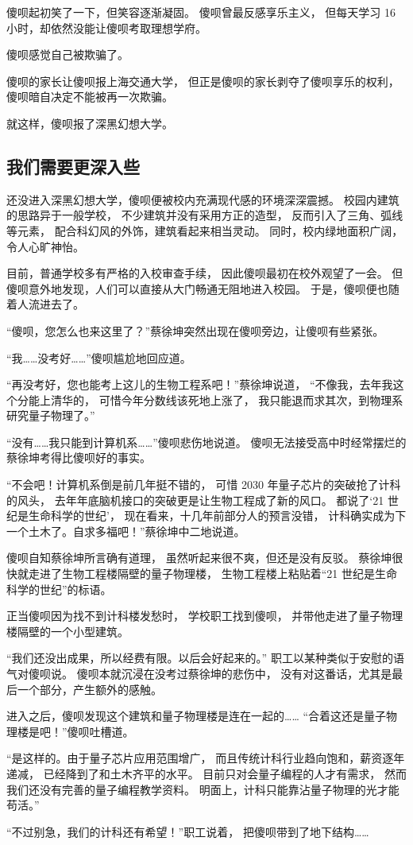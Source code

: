 \documentclass[UTF8,a4paper,11pt]{ctexart}
\newcommand{\p}{傻呗} %
\newcommand{\q}{蔡徐坤} %
\newcommand{\X}{深黑幻想大学} %
\begin{document}
      \p 起初笑了一下，但笑容逐渐凝固。
      \p 曾最反感享乐主义，
      但每天学习 16 小时，却依然没能让\p 考取理想学府。

      \p 感觉自己被欺骗了。

      \p 的家长让\p 报上海交通大学，
      但正是\p 的家长剥夺了\p 享乐的权利，
      \p 暗自决定不能被再一次欺骗。
      
      就这样，\p 报了\X 。
    \subsection{我们需要更深入些}
      还没进入\X ，\p 便被校内充满现代感的环境深深震撼。
      校园内建筑的思路异于一般学校，
      不少建筑并没有采用方正的造型，
      反而引入了三角、弧线等元素，
      配合科幻风的外饰，建筑看起来相当灵动。
      同时，校内绿地面积广阔，令人心旷神怡。

      目前，普通学校多有严格的入校审查手续，
      因此\p 最初在校外观望了一会。
      但\p 意外地发现，人们可以直接从大门畅通无阻地进入校园。
      于是，\p 便也随着人流进去了。
      
      “\p，您怎么也来这里了？”\q 突然出现在\p 旁边，让\p 有些紧张。

      “我……没考好……”\p 尴尬地回应道。

      “再没考好，您也能考上这儿的生物工程系吧！”\q 说道，
      “不像我，去年我这个分能上清华的，
      可惜今年分数线该死地上涨了，
      我只能退而求其次，到物理系研究量子物理了。”

      “没有……我只能到计算机系……”\p 悲伤地说道。
      \p 无法接受高中时经常摆烂的\q 考得比\p 好的事实。

      “不会吧！计算机系倒是前几年挺不错的，
      可惜 2030 年量子芯片的突破抢了计科的风头，
      去年年底脑机接口的突破更是让生物工程成了新的风口。
      都说了‘21 世纪是生命科学的世纪’，
      现在看来，十几年前部分人的预言没错，
      计科确实成为下一个土木了。自求多福吧！”\q 中二地说道。

      \p 自知\q 所言确有道理，
      虽然听起来很不爽，但还是没有反驳。
      \q 很快就走进了生物工程楼隔壁的量子物理楼，
      生物工程楼上粘贴着“21 世纪是生命科学的世纪”的标语。

      正当\p 因为找不到计科楼发愁时，
      学校职工找到\p，
      并带他走进了量子物理楼隔壁的一个小型建筑。

      “我们还没出成果，所以经费有限。以后会好起来的。”
      职工以某种类似于安慰的语气对\p 说。
      \p 本就沉浸在没考过\q 的悲伤中，
      没有对这番话，尤其是最后一个部分，产生额外的感触。

      进入之后，\p 发现这个建筑和量子物理楼是连在一起的……
      “合着这还是量子物理楼是吧！”\p 吐槽道。

      “是这样的。由于量子芯片应用范围增广，
      而且传统计科行业趋向饱和，薪资逐年递减，
      已经降到了和土木齐平的水平。
      目前只对会量子编程的人才有需求，
      然而我们还没有完善的量子编程教学资料。
      明面上，计科只能靠沾量子物理的光才能苟活。”
      
      “不过别急，我们的计科还有希望！”职工说着，
      把\p 带到了地下结构……
      
\end{document}
